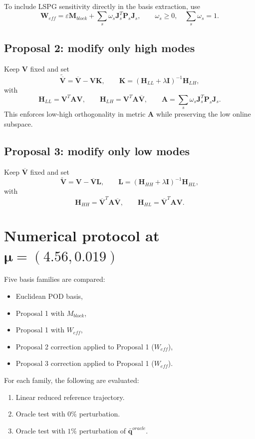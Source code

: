 \documentclass[11pt]{article}
\begin{document}
To include LSPG sensitivity directly in the basis extraction, use
\[
\mathbf W_{eff}
=\varepsilon\mathbf M_{block}
+\sum_s\omega_s\mathbf J_s^T\mathbf P_s\mathbf J_s,
\qquad
\omega_s\ge 0,
\quad
\sum_s\omega_s=1.
\]

\subsection*{Proposal 2: modify only high modes}
Keep \(\mathbf V\) fixed and set
\[
\widetilde{\overline{\mathbf V}}=\overline{\mathbf V}-\mathbf V\mathbf K,
\qquad
\mathbf K=(\mathbf H_{LL}+\lambda\mathbf I)^{-1}\mathbf H_{LH},
\]
with
\[
\mathbf H_{LL}=\mathbf V^T\mathbf A\mathbf V,
\qquad
\mathbf H_{LH}=\mathbf V^T\mathbf A\overline{\mathbf V},
\qquad
\mathbf A=\sum_s\omega_s\mathbf J_s^T\mathbf P_s\mathbf J_s.
\]
This enforces low-high orthogonality in metric \(\mathbf A\) while preserving the low online subspace.

\subsection*{Proposal 3: modify only low modes}
Keep \(\overline{\mathbf V}\) fixed and set
\[
\widetilde{\mathbf V}=\mathbf V-\overline{\mathbf V}\mathbf L,
\qquad
\mathbf L=(\mathbf H_{HH}+\lambda\mathbf I)^{-1}\mathbf H_{HL},
\]
with
\[
\mathbf H_{HH}=\overline{\mathbf V}^T\mathbf A\overline{\mathbf V},
\qquad
\mathbf H_{HL}=\overline{\mathbf V}^T\mathbf A\mathbf V.
\]

\section{Numerical protocol at \texorpdfstring{\(\bm\mu=(4.56,0.019)\)}{mu=(4.56,0.019)}}
Five basis families are compared:
\begin{itemize}[leftmargin=1.5em]
\item Euclidean POD basis,
\item Proposal 1 with \(M_{block}\),
\item Proposal 1 with \(W_{eff}\),
\item Proposal 2 correction applied to Proposal 1 (\(W_{eff}\)),
\item Proposal 3 correction applied to Proposal 1 (\(W_{eff}\)).
\end{itemize}

For each family, the following are evaluated:
\begin{enumerate}[leftmargin=1.5em]
\item Linear reduced reference trajectory.
\item Oracle test with \(0\%\) perturbation.
\item Oracle test with \(1\%\) perturbation of \(\bar{\mathbf q}^{oracle}\).
\end{enumerate}
\end{document}
